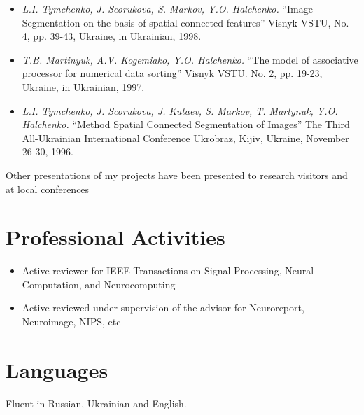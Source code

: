 \documentclass[12pt,overlapped,line]{res}
\newcommand{\mtitle}[1]{``#1''}
\newcommand{\mauthors}[1]{ \textit{#1.}}
\newcommand{\mwhere}[1]{#1.}
\begin{document}
\begin{resume}
\begin{itemize}
   \item
     \mauthors{L.I. Tymchenko, J. Scorukova, S. Markov, Y.O. Halchenko}
     \mtitle{Image Segmentation on the basis of spatial connected features}
     \mwhere{Visnyk VSTU, No. 4, pp. 39-43, Ukraine, in Ukrainian, 1998}

   \item
     \mauthors{T.B. Martinyuk, A.V. Kogemiako, Y.O. Halchenko}
     \mtitle{The model of associative processor for numerical data sorting}
     \mwhere{ Visnyk VSTU. No. 2, pp. 19-23, Ukraine, in Ukrainian, 1997}

   \item
     \mauthors{L.I. Tymchenko, J. Scorukova, J. Kutaev, S. Markov, T. Martynuk, Y.O. Halchenko}
     \mtitle{Method Spatial Connected Segmentation of Images}
     \mwhere{The Third All-Ukrainian International Conference Ukrobraz, Kijiv, Ukraine, November 26-30, 1996}
 \end{itemize}

 Other presentations of my projects have been presented to research visitors and at local conferences

\section{Professional Activities}
\begin{itemize}
\item Active reviewer for IEEE Transactions on Signal Processing,
  Neural Computation, and Neurocomputing
\item Active reviewed under supervision of the advisor for
  Neuroreport, Neuroimage, NIPS, etc
\end{itemize}


 \section{Languages}
 Fluent in Russian, Ukrainian and English.

\pagebreak

\end{resume}
\end{document}
